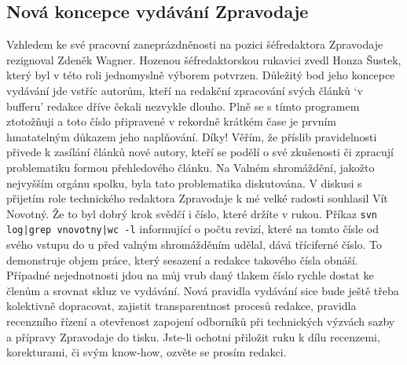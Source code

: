 \subsection*{Nová koncepce vydávání Zpravodaje}
Vzhledem ke své pracovní zaneprázdněnosti na pozici šéfredaktora Zpravodaje rezignoval Zdeněk Wagner.  Hozenou šéfredaktorskou rukavici zvedl Honza Šustek, který byl v této roli jednomyslně výborem potvrzen.  Důležitý bod jeho koncepce vydávání jde vstříc autorům, kteří na redakční zpracování svých článků `v bufferu' redakce dříve čekali nezvykle dlouho.
Plně se s tímto programem ztotožňuji a toto číslo připravené v rekordně krátkém čase je prvním hmatatelným důkazem jeho naplňování. Díky!  Věřím, že příslib pravidelnosti přivede k zasílání článků nové autory, kteří se podělí o své zkušenosti či zpracují problematiku formou přehledového článku.
Na Valném shromáždění, jakožto nejvyšším orgánu spolku, byla tato problematika diskutována.  V diskusi s přijetím role technického redaktora Zpravodaje k mé velké radosti souhlasil Vít Novotný.  Že to byl dobrý krok svědčí i číslo, které držíte v rukou.
Příkaz \texttt{svn log|grep vnovotny|wc -l} informující o počtu revizí, které na tomto čísle od svého vstupu do \CSTUG u před valným shromážděním udělal, dává tříciferné číslo.  To demonstruje objem práce, který sesazení a redakce takového čísla obnáší. Případné nejednotnosti jdou na můj vrub daný tlakem číslo rychle dostat ke členům a srovnat skluz ve vydávání.
Nová pravidla vydávání sice bude ještě třeba kolektivně dopracovat, zajistit transparentnost procesů redakce, pravidla recenzního řízení a otevřenost zapojení odborníků při technických výzvách sazby a přípravy Zpravodaje do tisku. Jste-li ochotni přiložit ruku k dílu recenzemi, korekturami, či svým know-how, ozvěte se prosím redakci.
